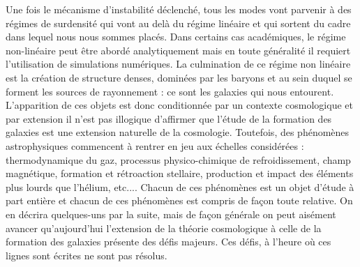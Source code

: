 Une fois le mécanisme d'instabilité déclenché, tous les modes vont parvenir à des régimes de surdensité qui vont au delà du régime linéaire et qui sortent du cadre dans lequel nous nous sommes placés. Dans certains cas académiques, le régime non-linéaire peut être abordé analytiquement mais en toute généralité il requiert l'utilisation de simulations numériques. La culmination de ce régime non linéaire est la création de structure denses, dominées par les baryons et au sein duquel se forment les sources de rayonnement : ce sont les galaxies qui nous entourent. L'apparition de ces objets est donc conditionnée par un contexte cosmologique et par extension il n'est pas illogique d'affirmer que l'étude de la formation des galaxies est une extension naturelle de la cosmologie. Toutefois, des phénomènes astrophysiques commencent à rentrer en jeu aux échelles considérées : thermodynamique du gaz, processus physico-chimique de refroidissement, champ magnétique, formation et rétroaction stellaire, production et impact des éléments plus lourds que l'hélium, etc.... Chacun de ces phénomènes est un objet d'étude à part entière et chacun de ces phénomènes est compris de façon toute relative. On en décrira quelques-uns par la suite, mais de façon générale on peut aisément avancer qu'aujourd'hui l'extension de la théorie cosmologique à celle de la formation des galaxies présente des défis majeurs. Ces défis, à l'heure où ces lignes sont écrites ne sont pas résolus.

